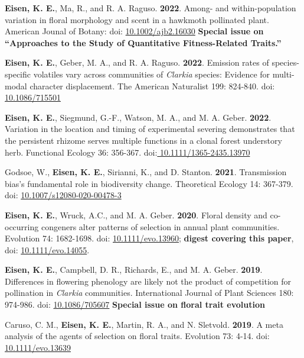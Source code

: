 \documentclass[letterpaper,11pt]{article}
\begin{document}
\begin{etaremune}
\item\textbf{Eisen, K. E.}, Ma, R., and R. A. Raguso. \textbf{2022}.  Among- and within-population variation in floral morphology and scent in a hawkmoth pollinated plant. American Jounal of Botany: doi: \href{https://doi.org/10.1002/ajb2.16030}{10.1002/ajb2.16030}
\textbf{Special issue on ``Approaches to the Study of Quantitative Fitness-Related Traits.''}\\

\item \textbf{Eisen, K. E.}, Geber, M. A., and R. A. Raguso. \textbf{2022}. Emission rates of species-specific volatiles vary across communities of \textit{Clarkia} species: Evidence for multi-modal character displacement. The American Naturalist 199: 824-840. doi: \href{https://doi.org/10.1086/715501}{10.1086/715501}\\

\item \textbf{Eisen, K. E.}, Siegmund, G.-F., Watson, M. A., and M. A. Geber. \textbf{2022}. Variation in the location and timing of experimental severing demonstrates that the persistent rhizome serves multiple functions in a clonal forest understory herb. Functional Ecology 36: 356-367. doi:\href{https://doi.org/10.1111/1365-2435.13970}{ 10.1111/1365-2435.13970}\\

\item Godsoe, W., \textbf{Eisen, K. E.}, Sirianni, K., and D. Stanton. \textbf{2021}. Transmission bias's fundamental role in biodiversity change. Theoretical Ecology 14: 367-379. doi:  \href{https://doi.org/10.1007/s12080-020-00478-3} {10.1007/s12080-020-00478-3} \\
\item \textbf{Eisen, K. E.}, Wruck, A.C., and M. A. Geber. \textbf{2020}. Floral density and co-occurring congeners alter patterns of selection in annual plant communities. Evolution 74: 1682-1698. doi:  \href{https://doi.org/10.1111/evo.13960} {10.1111/evo.13960}; \textbf{digest covering this paper}, doi: \href{https://doi.org/10.1111/evo.14055} {10.1111/evo.14055}. \\
\item \textbf{Eisen, K. E.}, Campbell, D. R., Richards, E., and M. A. Geber. \textbf{2019}. Differences in flowering phenology are likely not the product of competition for pollination in \textit{Clarkia} communities. International Journal of Plant Sciences 180: 974-986. doi:  \href{https://doi.org/10.1086/705607} {10.1086/705607} \textbf{Special issue on floral trait evolution}\\
\item Caruso, C. M., \textbf{Eisen, K. E.}, Martin, R. A., and N. Sletvold. \textbf{2019}. A meta analysis of the agents of selection on floral traits. Evolution 73: 4-14. doi:  \href{https://doi.org/10.1111/evo.13639} {10.1111/evo.13639}\\




\end{etaremune}
\end{document}
